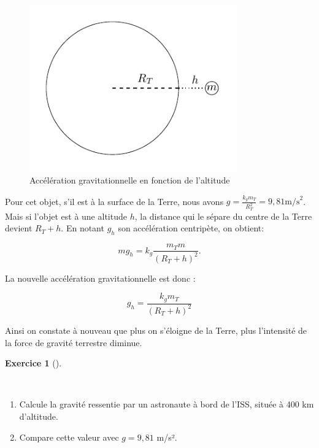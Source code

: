 \documentclass[
  letterpaper,
  DIV=11,
  numbers=noendperiod]{scrartcl}
\providecommand{\tightlist}{%
  \setlength{\itemsep}{0pt}\setlength{\parskip}{0pt}}\usepackage{longtable,booktabs,array}
\theoremstyle{definition}
\theoremstyle{definition}
\theoremstyle{definition}
\newtheorem{exercise}{Exercice}[section]
\theoremstyle{remark}
\begin{document}
\begin{figure}[H]

{\centering \includegraphics[width=0.8\textwidth,height=\textheight]{figures/grav/fig5.pdf}

}

\caption{Accélération gravitationnelle en fonction de l'altitude}

\end{figure}%

Pour cet objet, s'il est à la surface de la Terre, nous avons
\(g = \frac{k_g m_T}{R_T^2}=9,81 \text{m/s}^2\). Mais si l'objet est à
une altitude \(h\), la distance qui le sépare du centre de la Terre
devient \(R_T + h\). En notant \(g_h\) son accélération centripète, on
obtient:

\[
mg_h=k_g\dfrac{m_Tm}{(R_T+h)^2}.
\]

La nouvelle accélération gravitationnelle est donc :

\[
g_h = \frac{k_g m_T}{(R_T + h)^2}
\]

Ainsi on constate à nouveau que plus on s'éloigne de la Terre, plus
l'intensité de la force de gravité terrestre diminue.

\begin{exercise}[]\protect\hypertarget{exr-gravite-altitude}{}\label{exr-gravite-altitude}

~

\begin{enumerate}
\def\labelenumi{\arabic{enumi}.}
\tightlist
\item
  Calcule la gravité ressentie par un astronaute à bord de l'ISS, située
  à 400 km d'altitude.
\item
  Compare cette valeur avec \(g = 9,81\) m/s².
\end{enumerate}

\end{exercise}
\end{document}
